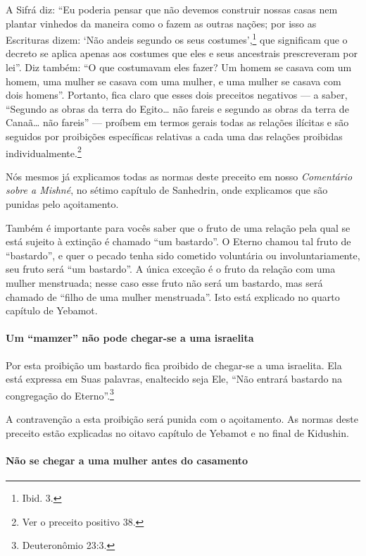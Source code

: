 A Sifrá diz: ``Eu poderia pensar que não devemos construir nossas casas
nem plantar vinhedos da maneira como o fazem as outras nações; por isso
as Escrituras dizem: `Não andeis segundo os seus costumes',\footnote{Ibid. 3.}
que significam que o decreto se aplica apenas aos costumes que eles e
seus ancestrais prescreveram por lei''. Diz também: ``O que costumavam
eles fazer? Um homem se casava com um homem, uma mulher se casava com
uma mulher, e uma mulher se casava com dois homens''. Portanto, fica
claro que esses dois preceitos negativos --- a saber, ``Segundo as obras
da terra do Egito\ldots{} não fareis e segundo as obras da terra de Canaã\ldots{} não fareis'' --- proíbem em termos gerais todas as relações ilícitas
e são seguidos por proibições específicas relativas a cada uma das
relações proibidas individualmente.\footnote{Ver o preceito positivo 38.}

Nós mesmos já explicamos todas as normas deste preceito em nosso
\emph{Comentário sobre a Mishné}, no sétimo capítulo de Sanhedrin, onde
explicamos que são punidas pelo açoitamento.

Também é importante para vocês saber que o fruto de uma relação pela
qual se está sujeito à extinção é chamado ``um bastardo''. O Eterno
chamou tal fruto de ``bastardo'', e quer o pecado tenha sido cometido
voluntária ou involuntariamente, seu fruto será ``um bastardo''. A única
exceção é o fruto da relação com uma mulher menstruada; nesse caso esse
fruto não será um bastardo, mas será chamado de ``filho de uma mulher
menstruada''. Isto está explicado no quarto capítulo de Yebamot.

\paragraph{Um ``mamzer'' não pode chegar-se a uma israelita}

Por esta proibição um bastardo fica proibido de chegar-se a uma
israelita. Ela está expressa em Suas palavras, enaltecido seja Ele,
``Não entrará bastardo na congregação do Eterno''.\footnote{Deuteronômio 23:3.}

A contravenção a esta proibição será punida com o açoitamento. As normas
deste preceito estão explicadas no oitavo capítulo de Yebamot e no
final de Kidushin.

\paragraph{Não se chegar a uma mulher antes do casamento}

